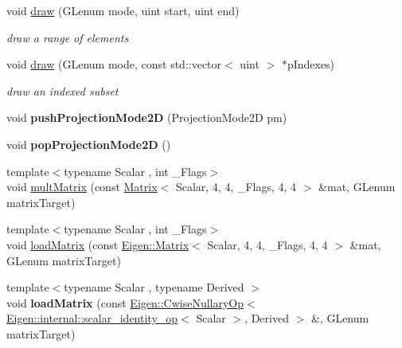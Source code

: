 \begin{DoxyCompactItemize}
void \hyperlink{class_gpu_helper_a4450191786c5b0533d4bc291d2b6ce19}{draw} (G\+Lenum mode, uint start, uint end)
\begin{DoxyCompactList}\small\item\em draw a range of elements \end{DoxyCompactList}\item 
\mbox{\label{class_gpu_helper_a2fe175b94cd2566fdf9645067b9dd69e}} 
void \hyperlink{class_gpu_helper_a2fe175b94cd2566fdf9645067b9dd69e}{draw} (G\+Lenum mode, const std\+::vector$<$ uint $>$ $\ast$p\+Indexes)
\begin{DoxyCompactList}\small\item\em draw an indexed subset \end{DoxyCompactList}\item 
\mbox{\label{class_gpu_helper_a101d705149a820494268ae84b6a5be3a}} 
void {\bfseries push\+Projection\+Mode2D} (Projection\+Mode2D pm)
\item 
\mbox{\label{class_gpu_helper_a1d4fb48533179c50f92123fd9df47d91}} 
void {\bfseries pop\+Projection\+Mode2D} ()
\item 
{\footnotesize template$<$typename Scalar , int \+\_\+\+Flags$>$ }\\void \hyperlink{class_gpu_helper_a3abb45392e7dcf6450fa94bd345d9096}{mult\+Matrix} (const \hyperlink{group___core___module_class_eigen_1_1_matrix}{Matrix}$<$ Scalar, 4, 4, \+\_\+\+Flags, 4, 4 $>$ \&mat, G\+Lenum matrix\+Target)
\item 
{\footnotesize template$<$typename Scalar , int \+\_\+\+Flags$>$ }\\void \hyperlink{class_gpu_helper_a31ac77373dc54409648558d79d5a8c3e}{load\+Matrix} (const \hyperlink{group___core___module_class_eigen_1_1_matrix}{Eigen\+::\+Matrix}$<$ Scalar, 4, 4, \+\_\+\+Flags, 4, 4 $>$ \&mat, G\+Lenum matrix\+Target)
\item 
\mbox{\label{class_gpu_helper_aa24d37715f29da09e4e970cfa4f1f1e7}} 
{\footnotesize template$<$typename Scalar , typename Derived $>$ }\\void {\bfseries load\+Matrix} (const \hyperlink{group___core___module_class_eigen_1_1_cwise_nullary_op}{Eigen\+::\+Cwise\+Nullary\+Op}$<$ \hyperlink{struct_eigen_1_1internal_1_1scalar__identity__op}{Eigen\+::internal\+::scalar\+\_\+identity\+\_\+op}$<$ Scalar $>$, Derived $>$ \&, G\+Lenum matrix\+Target)

\end{DoxyCompactItemize}
